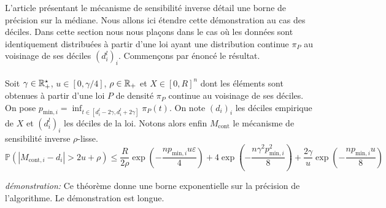 L'article présentant le mécanisme de sensibilité inverse \cite{Asi2020NearII} détail une borne de précision sur la médiane. Nous allons ici étendre cette démonstration au cas des déciles. Dans cette section nous nous plaçons dans le cas où les données sont identiquement distribuées à partir d'une loi ayant une distribution continue \(\pi_P\) au voisinage de ses déciles \((d_i^l)_i\). Commençons par énoncé le résultat.\\

\theoreme{}\\
Soit \(\gamma \in \mathbb{R}_+^\star\), \(u \in [0, \gamma/4]\), \(\rho \in \mathbb{R}_+\) et \(X \in [0,R]^n\) dont les éléments sont obtenues à partir d'une loi \(P\) de densité \(\pi_P\) continue au voisinage de ses déciles. On pose \(p_{\text{min}, i} = \inf_{t \in [d_i^l - 2\gamma, d_i^l + 2\gamma]} \pi_P(t)\). On note \((d_i)_i\) les déciles empirique de \(X\) et \((d_i^l)_i\) les déciles de la loi. Notons alors enfin \(M_{\text{cont}}\) le mécanisme de sensibilité inverse \(\rho\)-lisse.
\[
    \mathbb P\left( |M_{\text{cont}, i} - d_i| > 2u + \rho\right) \leq \dfrac{R}{2\rho}\exp\left(- \dfrac{np_{\text{min}, i}u\varepsilon}{4} \right) + 4\exp\left(- \dfrac{n\gamma^2p_{\text{min},i}^2}{8} \right) + \dfrac{2\gamma}{u}\exp\left( -\dfrac{np_{\text{min},i}u}{8} \right)
\]


\textit{démonstration:} Ce théorème donne une borne exponentielle sur la précision de l'algorithme. Le démonstration est longue.\\

